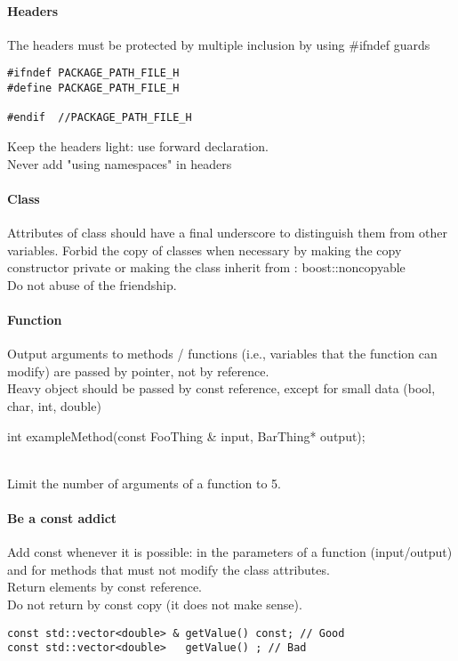 \paragraph{Headers}
The headers must be protected by multiple inclusion by using \#ifndef guards
\begin{verbatim}
#ifndef PACKAGE_PATH_FILE_H
#define PACKAGE_PATH_FILE_H

#endif  //PACKAGE_PATH_FILE_H
\end{verbatim}

Keep the headers light: use forward declaration.\\
Never add "using namespaces" in headers

\paragraph{Class}
Attributes of class should have a final underscore to distinguish them from other variables.
Forbid the copy of classes when necessary by making the copy constructor private or making the class inherit from : boost::noncopyable\\
Do not abuse of the friendship.

\paragraph{Function}
Output arguments to methods / functions (i.e., variables that the function can modify) are passed by pointer, not by reference.\\
Heavy object should be passed by const reference, except for small data (bool, char, int, double)\\
\begin{tt}
int exampleMethod(const FooThing \& input, BarThing* output);
\end{tt}\\
Limit the number of arguments of a function to 5.

\paragraph{Be a const addict} Add const whenever it is possible: in the parameters of a function (input/output) and for methods that must not modify the class attributes.\\
Return elements by const reference.\\
Do not return by const copy (it does not make sense).
\begin{verbatim}
const std::vector<double> & getValue() const; // Good
const std::vector<double>   getValue() ; // Bad
\end{verbatim}


